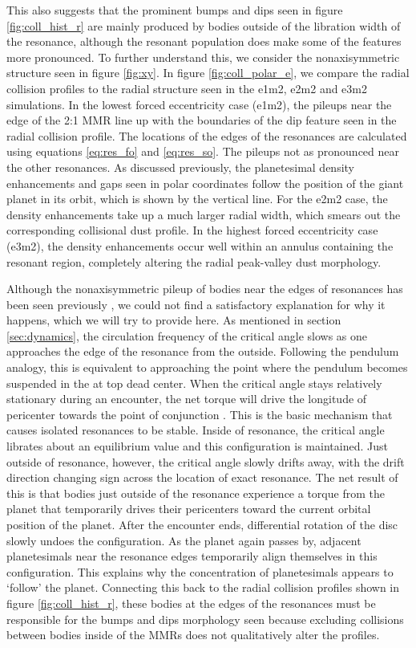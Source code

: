 \documentclass[fleqn,usenatbib]{mnras}
\begin{document}
This also suggests that the prominent bumps and dips seen in figure \ref{fig:coll_hist_r} are mainly produced by bodies outside of the libration width of the resonance, although 
the resonant population does make some of the features more pronounced. To further understand this, we consider the nonaxisymmetric structure 
seen in figure \ref{fig:xy}. In figure \ref{fig:coll_polar_e}, we compare the radial collision profiles to the radial structure seen in the e1m2, e2m2 and 
e3m2 simulations. In the lowest forced eccentricity case (e1m2), the pileups near the edge of the 2:1 MMR line up with the boundaries of the dip 
feature seen in the radial collision profile. The locations of the edges of the resonances are calculated using equations \ref{eq:res_fo} and 
\ref{eq:res_so}. The pileups not as pronounced near the other resonances. As discussed previously, the planetesimal density enhancements and gaps 
seen in polar coordinates follow the position of the giant planet in its orbit, which is shown by the vertical line. For the e2m2 case, the density 
enhancements take up a much larger radial width, which smears out the corresponding collisional dust profile. In the highest forced eccentricity case 
(e3m2), the density enhancements occur well within an annulus containing the resonant region, completely altering the radial peak-valley dust 
morphology.

Although the nonaxisymmetric pileup of bodies near the edges of resonances has been seen previously 
\citep{2000Icar..143...45R, 2016ApJ...818..159T}, we could not find a satisfactory explanation for why it happens, which we will try to provide here. As 
mentioned in section \ref{sec:dynamics}, the circulation frequency of the critical angle slows as one approaches the edge of the resonance from the 
outside. Following the pendulum analogy, this is equivalent to
approaching the point where the pendulum becomes suspended in the
at top dead center. 
When the critical angle stays relatively stationary during an encounter, the net torque will drive the longitude of pericenter towards the point of 
conjunction \citep{1976ARA&A..14..215P}.  This is the basic mechanism that causes isolated resonances to be stable. Inside of resonance, the critical 
angle librates about an equilibrium value and this configuration is maintained. Just outside of resonance, however, the critical angle slowly drifts away, with the 
drift direction changing sign across the location of exact resonance. The net result of this is that bodies just outside of the resonance experience a torque from 
the planet that temporarily drives their pericenters toward the current orbital position of the planet. After the encounter ends, differential rotation of the disc 
slowly undoes the configuration. As the planet again passes by, adjacent planetesimals near the resonance edges temporarily align 
themselves in this configuration. This explains why the concentration of planetesimals appears to `follow' the planet. Connecting this back to the radial collision profiles shown in 
figure \ref{fig:coll_hist_r}, these bodies at the edges of the resonances must be responsible for the bumps and dips morphology seen because excluding collisions between bodies inside 
of the MMRs does not qualitatively alter the profiles.
\end{document}
